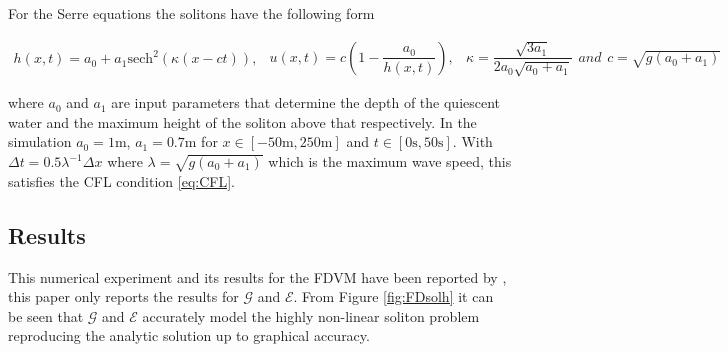 \documentclass[SingleSpace,12pt,Journal]{Serre_ASCE}
\begin{document}
For the Serre equations the solitons have the following form
\begin{linenomath*}
\begin{subequations}
\begin{gather}
h\left(x,t\right) = a_0 + a_1\text{sech}^2\left( \kappa\left(x - ct\right)\right),
\end{gather}
\begin{gather}
u\left(x,t\right) = c\left(1 - \dfrac{a_0}{h(x,t)} \right),
\end{gather}
\begin{gather}
\kappa = \dfrac{\sqrt{3a_1}}{2a_0 \sqrt{ a_0 + a_1}}
\end{gather}
and
\begin{gather}
c = \sqrt{g \left(a_0 + a_1\right)}
\end{gather}
\end{subequations}
\label{eq:sol}
\end{linenomath*}
where $a_0$ and $a_1$ are input parameters that determine the depth of the quiescent water and the maximum height of the soliton above that respectively. In the simulation $a_0 = 1\text{m}$, $a_1 = 0.7\text{m}$ for $x\in\left[-50\text{m},250\text{m}\right]$ and $t\in\left[0\text{s},50\text{s}\right]$. With $\Delta t = 0.5 \lambda^{-1} \Delta x$ where $\lambda = \sqrt{g \left(a_0 + a_1\right)}$ which is the maximum wave speed, this satisfies the CFL condition \eqref{eq:CFL}. 

\subsection{Results}
This numerical experiment and its results for the FDVM have been reported by , this paper only reports the results for $\mathcal{G}$ and $\mathcal{E}$. From Figure \ref{fig:FDsolh} it can be seen that $\mathcal{G}$ and $\mathcal{E}$ accurately model the highly non-linear soliton problem reproducing the analytic solution up to graphical accuracy.
\end{document}
